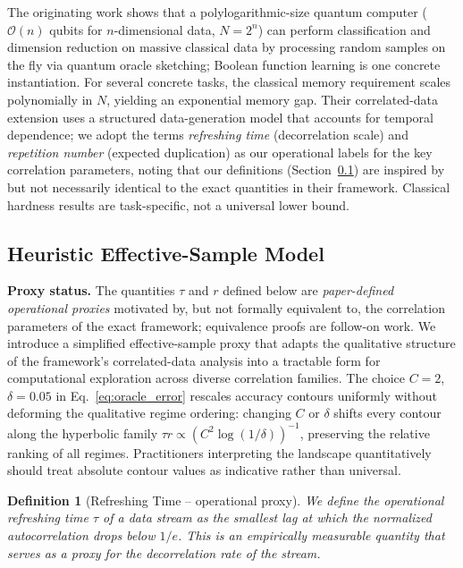 \documentclass[preprint,12pt,authoryear]{elsarticle}
\newtheorem{definition}{Definition}
\newcommand{\bigO}{\mathcal{O}}
\begin{document}
The originating work \citep{zhao2026exponential} shows that a polylogarithmic-size quantum computer ($\bigO(n)$ qubits for $n$-dimensional data, $N = 2^n$) can perform classification and dimension reduction on massive classical data by processing random samples on the fly via quantum oracle sketching; Boolean function learning is one concrete instantiation. For several concrete tasks, the classical memory requirement scales polynomially in $N$, yielding an exponential memory gap. Their correlated-data extension uses a structured data-generation model that accounts for temporal dependence; we adopt the terms \emph{refreshing time} (decorrelation scale) and \emph{repetition number} (expected duplication) as our operational labels for the key correlation parameters, noting that our definitions (Section~\ref{sec:heuristic_model}) are inspired by but not necessarily identical to the exact quantities in their framework. Classical hardness results are task-specific, not a universal lower bound.

\subsection{Heuristic Effective-Sample Model}
\label{sec:heuristic_model}

\textbf{Proxy status.} The quantities $\tau$ and $r$ defined below are \emph{paper-defined operational proxies} motivated by, but not formally equivalent to, the correlation parameters of the exact framework; equivalence proofs are follow-on work. We introduce a simplified effective-sample proxy that adapts the qualitative structure of the framework's correlated-data analysis into a tractable form for computational exploration across diverse correlation families. The choice $C{=}2$, $\delta{=}0.05$ in Eq.~\eqref{eq:oracle_error} rescales accuracy contours uniformly without deforming the qualitative regime ordering: changing $C$ or $\delta$ shifts every contour along the hyperbolic family $\tau r \propto (C^2 \log(1/\delta))^{-1}$, preserving the relative ranking of all regimes. Practitioners interpreting the landscape quantitatively should treat absolute contour values as indicative rather than universal.

\begin{definition}[Refreshing Time -- operational proxy]
We define the \emph{operational refreshing time} $\tau$ of a data stream as the smallest lag at which the normalized autocorrelation drops below $1/e$. This is an empirically measurable quantity that serves as a proxy for the decorrelation rate of the stream.
\end{definition}
\end{document}
